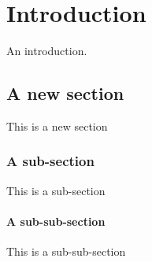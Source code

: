 \chapter{Introduction}
\label{chapter:introduction}

An introduction.

\section{A new section}

This is a new section

\subsection{A sub-section}

This is a sub-section

\subsubsection{A sub-sub-section}

This is a sub-sub-section



